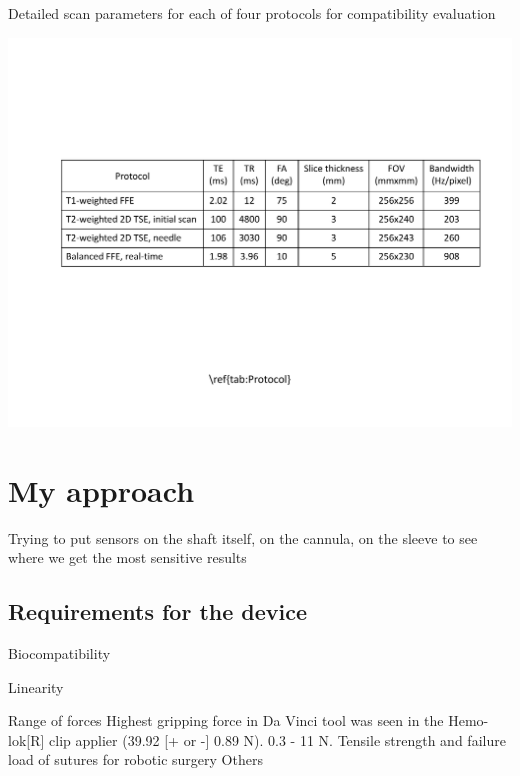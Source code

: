 \begin{table}[htb]
  \begin{center}
\caption[Scan parameters for compatibility evaluation.]{Detailed scan parameters for each of four protocols for compatibility evaluation}
\label{tab:Protocol}
  \end{center}
\includegraphics[width=150mm]{Fig/chap1/Protocol.pdf}
\end{table}
\vspace{-2mm}

\section{My approach}
\label{sec:MyAppr}
Trying to put sensors on the shaft itself, on the cannula, on the sleeve to see where we get the most sensitive results

\subsection{Requirements for the device}
\label{sec:DevReq}
Biocompatibility

Linearity

Range of forces 
Highest gripping force in Da Vinci tool was seen in the Hemo-lok[R] clip applier (39.92 [+ or -] 0.89 N).
0.3 - 11 N. 
Tensile strength and failure load of sutures for robotic surgery
Others

